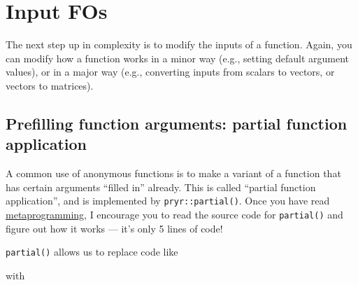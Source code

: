 \hypertarget{input-fos}{%
\section{Input FOs}\label{input-fos}}

The next step up in complexity is to modify the inputs of a function.
Again, you can modify how a function works in a minor way (e.g., setting
default argument values), or in a major way (e.g., converting inputs
from scalars to vectors, or vectors to matrices).

\hypertarget{prefilling-function-arguments-partial-function-application}{%
\subsection{Prefilling function arguments: partial function
application}\label{prefilling-function-arguments-partial-function-application}}

A common use of anonymous functions is to make a variant of a function
that has certain arguments ``filled in'' already. This is called
``partial function application'', and is implemented by
\texttt{pryr::partial()}. Once you have read
\protect\hyperlink{metaprogramming}{metaprogramming}, I encourage you to
read the source code for \texttt{partial()} and figure out how it works
--- it's only 5 lines of code! 
 

\texttt{partial()} allows us to replace code like

\begin{Shaded}
\begin{Highlighting}[]
\StringTok{ } \NormalTok{)}
\StringTok{ }\NormalTok{(}
\NormalTok{(}
\end{Highlighting}
\end{Shaded}

with

\begin{Shaded}
\begin{Highlighting}[]
\StringTok{ } \NormalTok{)}
\StringTok{ }
\NormalTok{(}
\end{Highlighting}
\end{Shaded}

